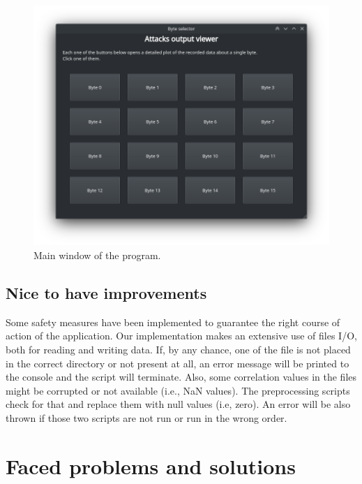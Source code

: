 \documentclass[11pt,a4paper]{article}
\begin{document}
\begin{figure}[H]
    \centering
    \includegraphics[scale=0.6]{main_window.png}
    \caption{Main window of the program.}
    \label{fig:main_window}
\end{figure}

\subsection{Nice to have improvements}
Some safety measures have been implemented to guarantee the right course of action of the application.
Our implementation makes an extensive use of files I/O, both for reading and writing data.
If, by any chance, one of the file is not placed in the correct directory or not present at all, an error message will be printed to the console and the script will terminate.
Also, some correlation values in the files might be corrupted or not available (i.e., NaN values).
The preprocessing scripts check for that and replace them with null values (i.e, zero).
An error will be also thrown if those two scripts are not run or run in the wrong order.


\section{Faced problems and solutions}
\label{sec:faced-problems-and-solutions}
\end{document}
